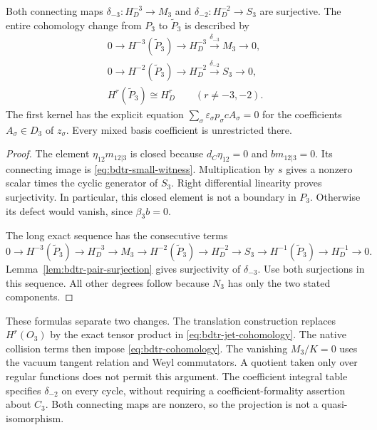 \begin{theorem}\label{thm:bdtr-cohomology}
Both connecting maps $\delta_{-3}:H_D^{-3}\to M_3$ and $\delta_{-2}:H_D^{-2}\to S_3$ are surjective.
The entire cohomology change from $P_3$ to $\widetilde P_3$ is described by
\begin{equation}\label{eq:bdtr-cohomology}
 \begin{gathered}
 0\longrightarrow H^{-3}(\widetilde P_3)\longrightarrow H_D^{-3}
      \xrightarrow{\delta_{-3}}M_3\longrightarrow0,\\
 0\longrightarrow H^{-2}(\widetilde P_3)\longrightarrow H_D^{-2}
      \xrightarrow{\delta_{-2}}S_3\longrightarrow0,\\
 H^r(\widetilde P_3)\cong H_D^r\qquad(r\ne-3,-2).
 \end{gathered}
\end{equation}
The first kernel has the explicit equation
$\sum_\sigma\varepsilon_\sigma p_\sigma c A_\sigma=0$ for the coefficients
$A_\sigma\in D_3$ of $z_\sigma$.
Every mixed basis coefficient is unrestricted there.
\end{theorem}
\begin{proof}
The element $\eta_{12}m_{12|3}$ is closed because $d_C\eta_{12}=0$ and $bm_{12|3}=0$.
Its connecting image is \eqref{eq:bdtr-small-witness}.
Multiplication by $s$ gives a nonzero scalar times the cyclic generator of $S_3$.
Right differential linearity proves surjectivity.
In particular, this closed element is not a boundary in $P_3$.
Otherwise its defect would vanish, since $\beta_3b=0$.

The long exact sequence has the consecutive terms
\[
 0\to H^{-3}(\widetilde P_3)\to H_D^{-3}\to M_3
 \to H^{-2}(\widetilde P_3)\to H_D^{-2}\to S_3
 \to H^{-1}(\widetilde P_3)\to H_D^{-1}\to0.
\]
Lemma~\ref{lem:bdtr-pair-surjection} gives surjectivity of $\delta_{-3}$.
Use both surjections in this sequence.
All other degrees follow because $N_3$ has only the two stated components.
\end{proof}

These formulas separate two changes.
The translation construction replaces $H^r(O_3)$ by the exact tensor product in \eqref{eq:bdtr-jet-cohomology}.
The native collision terms then impose \eqref{eq:bdtr-cohomology}.
The vanishing $M_3/K=0$ uses the vacuum tangent relation and Weyl commutators.
A quotient taken only over regular functions does not permit this argument.
The coefficient integral table specifies $\delta_{-2}$ on every cycle, without requiring a coefficient-formality assertion about $C_3$.
Both connecting maps are nonzero, so the projection is not a quasi-isomorphism.

